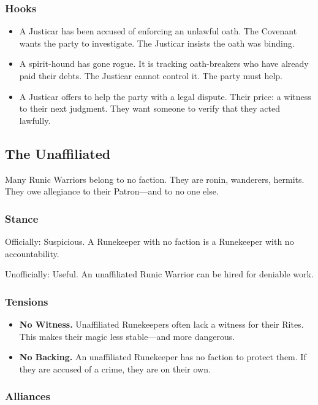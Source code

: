 \subsubsection{Hooks}

\begin{itemize}
\item A Justicar has been accused of enforcing an unlawful oath. The Covenant wants the party to investigate. The Justicar insists the oath was binding.
\item A spirit-hound has gone rogue. It is tracking oath-breakers who have already paid their debts. The Justicar cannot control it. The party must help.
\item A Justicar offers to help the party with a legal dispute. Their price: a witness to their next judgment. They want someone to verify that they acted lawfully.
\end{itemize}

\subsection{The Unaffiliated}

Many Runic Warriors belong to no faction. They are ronin, wanderers, hermits. They owe allegiance to their Patron—and to no one else.

\subsubsection{Stance}

Officially: Suspicious. A Runekeeper with no faction is a Runekeeper with no accountability.

Unofficially: Useful. An unaffiliated Runic Warrior can be hired for deniable work.

\subsubsection{Tensions}

\begin{itemize}
\item \textbf{No Witness.} Unaffiliated Runekeepers often lack a witness for their Rites. This makes their magic less stable—and more dangerous.
\item \textbf{No Backing.} An unaffiliated Runekeeper has no faction to protect them. If they are accused of a crime, they are on their own.
\end{itemize}

\subsubsection{Alliances}

